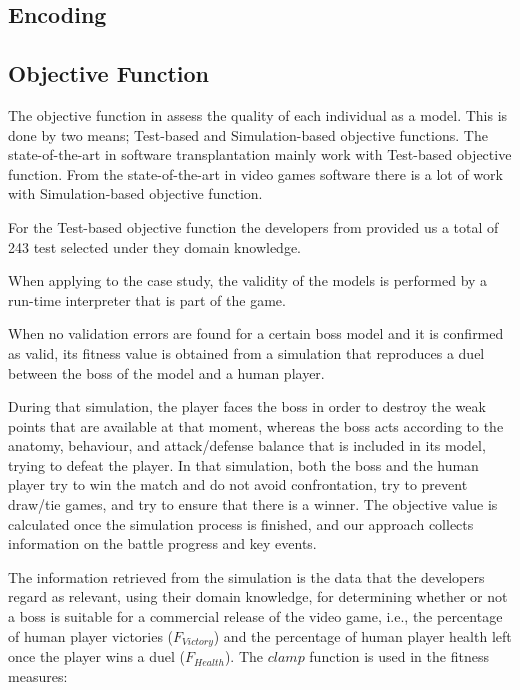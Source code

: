 \subsection{Encoding}





\subsection{Objective Function}

The objective function in \ApproachName{} assess the quality of each individual as a model. This is done by two means; Test-based and Simulation-based objective functions. The state-of-the-art in software transplantation mainly work with Test-based objective function. From the state-of-the-art in video games software there is a lot of work with Simulation-based objective function.

For the Test-based objective function the developers from \CaseStudy{} provided us a total of 243 test selected under they domain knowledge. 

When applying \ApproachName{} to the \CaseStudy{} case study, the validity of the models is performed by a run-time interpreter that is part of the game. 

When no validation errors are found for a certain boss model and it is confirmed as valid, its fitness value is obtained from a simulation that reproduces a duel between the boss of the model and a human player. 

During that simulation, the player faces the boss in order to destroy the weak points that are available at that moment, whereas the boss acts according to the anatomy, behaviour, and attack/defense balance that is included in its model, trying to defeat the player. In that simulation, both the boss and the human player try to win the match and do not avoid confrontation, try to prevent draw/tie games, and try to ensure that there is a winner. The objective value is calculated once the simulation process is finished, and our approach collects information on the battle progress and key events.

The information retrieved from the simulation is the data that the developers regard as relevant, using their domain knowledge, for determining whether or not a boss is suitable for a commercial release of the video game, i.e., the percentage of human player victories ($F_{Victory}$) and the percentage of human player health left once the player wins a duel ($F_{Health}$). The $clamp$ function is used in the fitness measures:

